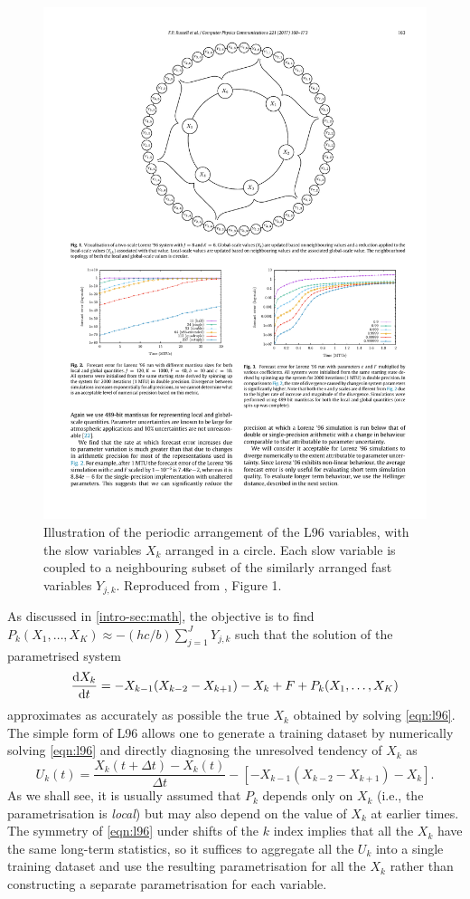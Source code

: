 \documentclass[../main.tex]{subfiles}
\begin{document}
\begin{figure}[ht]
    \centering
    \includegraphics[width=0.7\linewidth]{figures/russell2017_L96_diagram.pdf}
    \caption{ Illustration of the periodic arrangement of the L96 variables,
        with the slow variables $X_k$ arranged in a circle. Each slow variable
        is coupled to a neighbouring subset of the similarly arranged fast
        variables $Y_{j,k}$. Reproduced from \textcite{russell2017}, Figure 1.
        }
    \label{fig:L96_diagram}
\end{figure}

As discussed in \cref{intro-sec:math}, the objective is to find $P_k(X_1,
\dots, X_K) \approx -(hc/b) \sum_{j=1}^J Y_{j,k}$ such that the solution of the
parametrised system
\begin{equation*}
    \frac{\mathrm{d} X_k}{\mathrm{d} t}
        = -X_{k-1} (X_{k-2} - X_{k+1}) - X_k + F + P_k(X_1, \dots, X_K)
\end{equation*}
approximates as accurately as possible the true $X_k$ obtained by solving
\cref{eqn:l96}. The simple form of L96 allows one to generate a training
dataset by numerically solving \cref{eqn:l96} and directly diagnosing the
unresolved tendency of $X_k$ as
\begin{equation} \label{eqn:l96_tendency}
    U_k(t) = \frac{X_k(t + \Delta t) - X_k(t)}{\Delta t}
        - \left[ -X_{k-1} (X_{k-2} - X_{k+1}) - X_k \right].
\end{equation}
As we shall see, it is usually assumed that $P_k$ depends only on $X_k$ (i.e.,
the parametrisation is \emph{local}) but may also depend on the value of $X_k$
at earlier times. The symmetry of \cref{eqn:l96} under shifts of the $k$ index
implies that all the $X_k$ have the same long-term statistics, so it suffices
to aggregate all the $U_k$ into a single training dataset and use the resulting
parametrisation for all the $X_k$ rather than constructing a separate
parametrisation for each variable.
\end{document}

